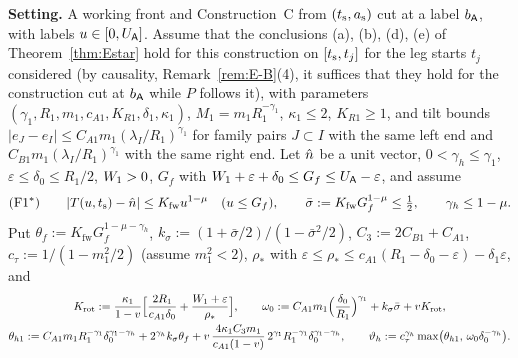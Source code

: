 \noindent\textbf{Setting.} A working front and Construction~C from $(t_{\mathrm s},a_{\mathrm s})$ cut at a label $b_{\mathsf A}$, with labels
$u\in[0,U_{\mathsf A}]$. Assume that the conclusions (a), (b), (d), (e) of Theorem~\ref{thm:Estar} hold for this construction on
$[t_{\mathrm s},t_j]$ for the leg starts $t_j$ considered (by causality, Remark~\ref{rem:E-B}(4), it suffices that they hold for the
construction cut at $b_{\mathsf A}$ while $P$ follows it), with parameters $(\gamma_1,R_1,m_1,c_{A1},K_{R1},\delta_1,\kappa_1)$,
$M_1=m_1R_1^{-\gamma_1}$, $\kappa_1\le2$, $K_{R1}\ge1$, and tilt bounds
$|e_J-e_I|\le C_{A1}m_1(\lambda_I/R_1)^{\gamma_1}$ for family pairs $J\subset I$ with the same left end and
$C_{B1}m_1(\lambda_I/R_1)^{\gamma_1}$ with the same right end. Let $\hat n$ be a unit vector, $0<\gamma_h\le\gamma_1$,
$\varepsilon\le\delta_0\le R_1/2$, $W_1>0$, $G_f$ with $W_1+\varepsilon+\delta_0\le G_f\le U_{\mathsf A}-\varepsilon$, and assume
\[
\textup{(F1$^*$)}\qquad|T(u,t_{\mathrm s})-\hat n|\le K_{\mathrm{fw}}u^{1-\mu}\quad(u\le G_f),\qquad
\bar\sigma:=K_{\mathrm{fw}}G_f^{1-\mu}\le\tfrac12,\qquad\gamma_h\le1-\mu .
\]
Put $\theta_f:=K_{\mathrm{fw}}G_f^{1-\mu-\gamma_h}$, $k_\sigma:=(1+\bar\sigma/2)/(1-\bar\sigma^2/2)$,
$C_3:=2C_{B1}+C_{A1}$, $c_\tau:=1/(1-m_1^2/2)$ (assume $m_1^2<2$),
$\rho_*$ with $\varepsilon\le\rho_*\le c_{A1}(R_1-\delta_0-\varepsilon)-\delta_1\varepsilon$, and
\begin{gather*}
K_{\mathrm{rot}}:=\frac{\kappa_1}{1-v}\Bigl[\frac{2R_1}{c_{A1}\delta_0}+\frac{W_1+\varepsilon}{\rho_*}\Bigr],\qquad
\omega_0:=C_{A1}m_1\Bigl(\frac{\delta_0}{R_1}\Bigr)^{\gamma_1}+k_\sigma\bar\sigma+vK_{\mathrm{rot}},\\
\theta_{h1}:=C_{A1}m_1R_1^{-\gamma_1}\delta_0^{\gamma_1-\gamma_h}+2^{\gamma_h}k_\sigma\theta_f
+v\,\frac{4\kappa_1C_3m_1}{c_{A1}(1-v)}\,2^{\gamma_1}R_1^{-\gamma_1}\delta_0^{\gamma_1-\gamma_h},\qquad
\vartheta_h:=c_\tau^{\gamma_h}\max\bigl(\theta_{h1},\,\omega_0\delta_0^{-\gamma_h}\bigr).
\end{gather*}

